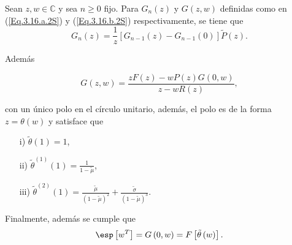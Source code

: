 \begin{Prop}\label{Prop.1.1.2S}
Sean $z,w\in\mathbb{C}$ y sea $n\geq0$ fijo. Para $G_{n}\left(z\right)$ y $G\left(z,w\right)$ definidas como en
(\ref{Eq.3.16.a.2S}) y (\ref{Eq.3.16.b.2S}) respectivamente, se tiene que
\begin{equation}\label{Eq.Pag.45}
G_{n}\left(z\right)=\frac{1}{z}\left[G_{n-1}\left(z\right)-G_{n-1}\left(0\right)\right]\tilde{P}\left(z\right).
\end{equation}

Adem\'as


\begin{equation}\label{Eq.Pag.46}
G\left(z,w\right)=\frac{zF\left(z\right)-wP\left(z\right)G\left(0,w\right)}{z-wR\left(z\right)},
\end{equation}

con un \'unico polo en el c\'irculo unitario, adem\'as, el polo es
de la forma $z=\theta\left(w\right)$ y satisface que

\begin{enumerate}
\item[i)]$\tilde{\theta}\left(1\right)=1$,

\item[ii)] $\tilde{\theta}^{(1)}\left(1\right)=\frac{1}{1-\tilde{\mu}}$,

\item[iii)]
$\tilde{\theta}^{(2)}\left(1\right)=\frac{\tilde{\mu}}{\left(1-\tilde{\mu}\right)^{2}}+\frac{\tilde{\sigma}}{\left(1-\tilde{\mu}\right)^{3}}$.
\end{enumerate}

Finalmente, adem\'as se cumple que
\begin{equation}
\esp\left[w^{T}\right]=G\left(0,w\right)=F\left[\tilde{\theta}\left(w\right)\right].
\end{equation}
\end{Prop}
